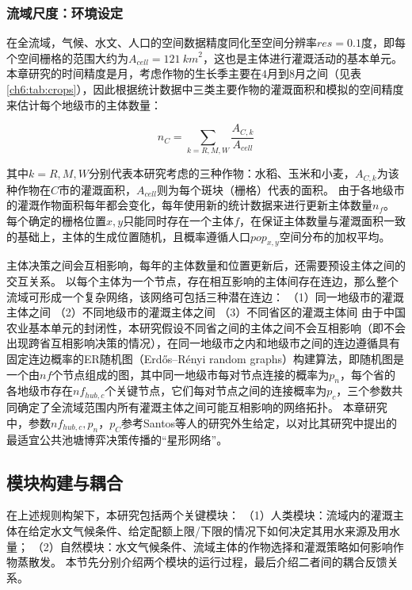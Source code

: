 \subsubsection{流域尺度：环境设定}

在全流域，气候、水文、人口的空间数据精度同化至空间分辨率$res = 0.1$度，即每个空间栅格的范围大约为$A_{cell} = 121~{km}^2$，这也是主体进行灌溉活动的基本单元。
本章研究的时间精度是月，考虑作物的生长季主要在$4$月到$8$月之间（见表\ref{ch6:tab:crops}），因此根据统计数据中三类主要作物的灌溉面积和模拟的空间精度来估计每个地级市的主体数量：

\begin{equation}
    n_{C} = \sum_{k=R, M, W}\frac{A_{C, k}}{A_{cell}}
\end{equation}

其中$k = R, M, W$分别代表本研究考虑的三种作物：水稻、玉米和小麦，$A_{C, k}$为该种作物在$C$市的灌溉面积，$A_{cell}$则为每个斑块（栅格）代表的面积。
由于各地级市的灌溉作物面积每年都会变化，每年使用新的统计数据来进行更新主体数量$n_f$。
每个确定的栅格位置$x, y$只能同时存在一个主体$f$，在保证主体数量与灌溉面积一致的基础上，主体的生成位置随机，且概率遵循人口$pop_{x, y}$空间分布的加权平均。

主体决策之间会互相影响，每年的主体数量和位置更新后，还需要预设主体之间的交互关系。
以每个主体为一个节点，存在相互影响的主体间存在连边，那么整个流域可形成一个复杂网络，该网络可包括三种潜在连边：
（1）同一地级市的灌溉主体之间
（2）不同地级市的灌溉主体之间
（3）不同省区的灌溉主体间
由于中国农业基本单元的封闭性，本研究假设不同省之间的主体之间不会互相影响（即不会出现跨省互相影响决策的情况），在同一地级市之内和地级市之间的连边遵循具有固定连边概率的ER随机图（Erdős–Rényi random graphs）构建算法，即随机图是一个由$nf$个节点组成的图，其中同一地级市每对节点连接的概率为$p_n$，每个省的各地级市存在$nf_{hub, c}$个关键节点，它们每对节点之间的连接概率为$p_c$，三个参数共同确定了全流域范围内所有灌溉主体之间可能互相影响的网络拓扑。
本章研究中，参数$nf_{hub, c}, p_n$，$p_C$参考Santos等人的研究外生给定\cite{santos2008}，以对比其研究中提出的最适宜公共池塘博弈决策传播的“星形网络”。



\subsection{模块构建与耦合}

在上述规则构架下，本研究包括两个关键模块：
（1）人类模块：流域内的灌溉主体在给定水文气候条件、给定配额上限/下限的情况下如何决定其用水来源及用水量；
（2）自然模块：水文气候条件、流域主体的作物选择和灌溉策略如何影响作物蒸散发。
本节先分别介绍两个模块的运行过程，最后介绍二者间的耦合反馈关系。

